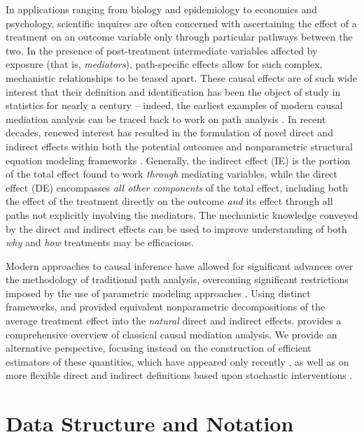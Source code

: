 \documentclass[
  12pt, krantz2,
]{krantz}
\newcommand{\1}{\mathbbm{1}}
\theoremstyle{definition}
\theoremstyle{definition}
\theoremstyle{definition}
\theoremstyle{definition}
\theoremstyle{remark}
\begin{document}
In applications ranging from biology and epidemiology to economics and
psychology, scientific inquires are often concerned with ascertaining the effect
of a treatment on an outcome variable only through particular pathways between
the two. In the presence of post-treatment intermediate variables affected by
exposure (that is, \emph{mediators}), path-specific effects allow for such complex,
mechanistic relationships to be teased apart. These causal effects are of such
wide interest that their definition and identification has been the object of
study in statistics for nearly a century -- indeed, the earliest examples of
modern causal mediation analysis can be traced back to work on path analysis
\citep{wright1934method}. In recent decades, renewed interest has resulted in the
formulation of novel direct and indirect effects within both the potential
outcomes and nonparametric structural equation modeling frameworks
\citep{robins1986new, pearl1995causal, pearl2009causality, spirtes2000causation, dawid2000causal}. Generally, the indirect effect (IE) is the portion of the
total effect found to work \emph{through} mediating variables, while the direct
effect (DE) encompasses \emph{all other components} of the total effect, including
both the effect of the treatment directly on the outcome \emph{and} its effect
through all paths not explicitly involving the mediators. The mechanistic
knowledge conveyed by the direct and indirect effects can be used to improve
understanding of both \emph{why} and \emph{how} treatments may be efficacious.

Modern approaches to causal inference have allowed for significant advances over
the methodology of traditional path analysis, overcoming significant
restrictions imposed by the use of parametric modeling approaches
\citep{vanderweele2015explanation}. Using distinct frameworks,
\citet{robins1992identifiability} and \citet{pearl2001direct} provided equivalent
nonparametric decompositions of the average treatment effect into the \emph{natural}
direct and indirect effects. \citet{vanderweele2015explanation} provides a
comprehensive overview of classical causal mediation analysis. We provide an
alternative perspective, focusing instead on the construction of efficient
estimators of these quantities, which have appeared only recently
\citep{tchetgen2012semiparametric, zheng2012targeted}, as well as on more flexible
direct and indirect definitions based upon stochastic interventions
\citep{diaz2020causal}.

\hypertarget{data-structure-and-notation-2}{%
\section{Data Structure and Notation}\label{data-structure-and-notation-2}}
\end{document}
